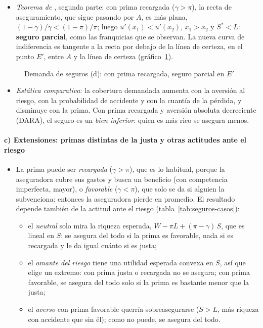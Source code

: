 \documentclass[11pt]{article}
\begin{document}
\begin{itemize}
\item \emph{Teorema de }, segunda parte: con prima recargada ($\gamma>\pi$), la recta de aseguramiento, que sigue pasando por $A$, es más plana, $(1-\gamma)/\gamma<(1-\pi)/\pi$; luego $u'(x_1)<u'(x_2)$, $x_1>x_2$ y $S^*<L$: \textbf{seguro parcial}, como las franquicias que se observan. La nueva curva de indiferencia es tangente a la recta por debajo de la línea de certeza, en el punto $E'$, entre $A$ y la línea de certeza (gráfico~\ref{fig:seguros}).
\end{itemize}

\begin{figure}[H]
\centering
\caption{Demanda de seguros (d): con prima recargada, seguro parcial en $E'$}\label{fig:seguros}
\end{figure}

\begin{itemize}
\item \emph{Estática comparativa}: la cobertura demandada aumenta con la aversión al riesgo, con la probabilidad de accidente y con la cuantía de la pérdida, y disminuye con la prima. Con prima recargada y aversión absoluta decreciente (DARA), el seguro es un \emph{bien inferior}: quien es más rico se asegura menos\nocite{Mossin1968Aspects}.
\end{itemize}

\paragraph{c) Extensiones: primas distintas de la justa y otras actitudes ante el riesgo}

\begin{itemize}
\item La prima puede ser \emph{recargada} ($\gamma>\pi$), que es lo habitual, porque la aseguradora cubre sus gastos y busca un beneficio (con competencia imperfecta, mayor), o \emph{favorable} ($\gamma<\pi$), que solo se da si alguien la subvenciona: entonces la aseguradora pierde en promedio. El resultado depende también de la actitud ante el riesgo (tabla~\ref{tab:seguros-casos}):
  \begin{itemize}
  \item el \emph{neutral} solo mira la riqueza esperada, $\overline{W}-\pi L+(\pi-\gamma)\,S$, que es lineal en $S$: se asegura del todo si la prima es favorable, nada si es recargada y le da igual cuánto si es justa;
  \item el \emph{amante del riesgo} tiene una utilidad esperada convexa en $S$, así que elige un extremo: con prima justa o recargada no se asegura; con prima favorable, se asegura del todo solo si la prima es bastante menor que la justa;
  \item el \emph{averso} con prima favorable querría sobreasegurarse ($S>L$, más riqueza con accidente que sin él); como no puede, se asegura del todo.
  \end{itemize}
\end{itemize}
\end{document}
